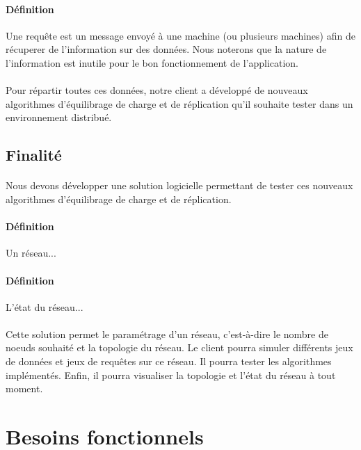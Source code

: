 \documentclass[12pt]{article}
\begin{document}
\paragraph{Définition} Une requête est un message envoyé à une machine (ou plusieurs machines) afin de récuperer de l'information sur des données.
Nous noterons que la nature de l'information est inutile pour le bon fonctionnement de l'application.


\paragraph{} Pour répartir toutes ces données, notre client a développé de nouveaux algorithmes d'équilibrage de charge et de réplication qu'il souhaite tester dans un environnement distribué.

\subsection{Finalité}

\paragraph{} Nous devons développer une solution logicielle permettant de tester ces nouveaux algorithmes d'équilibrage de charge et de réplication.

\paragraph{Définition} Un réseau...

\paragraph{Définition} L'état du réseau...

\paragraph{}Cette solution permet le paramétrage d'un réseau, c'est-à-dire le nombre de noeuds souhaité et la topologie du réseau.
Le client pourra simuler différents jeux de données et jeux de requêtes sur ce réseau.
Il pourra tester les algorithmes implémentés.
Enfin, il pourra visualiser la topologie et l'état du réseau à tout moment.

\newpage

\section{Besoins fonctionnels}
\end{document}
